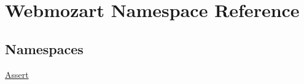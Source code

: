 \hypertarget{namespace_webmozart}{}\section{Webmozart Namespace Reference}
\label{namespace_webmozart}
\subsection*{Namespaces}
\begin{DoxyCompactItemize}
\item 
 \mbox{\hyperlink{namespace_webmozart_1_1_assert}{Assert}}
\end{DoxyCompactItemize}
